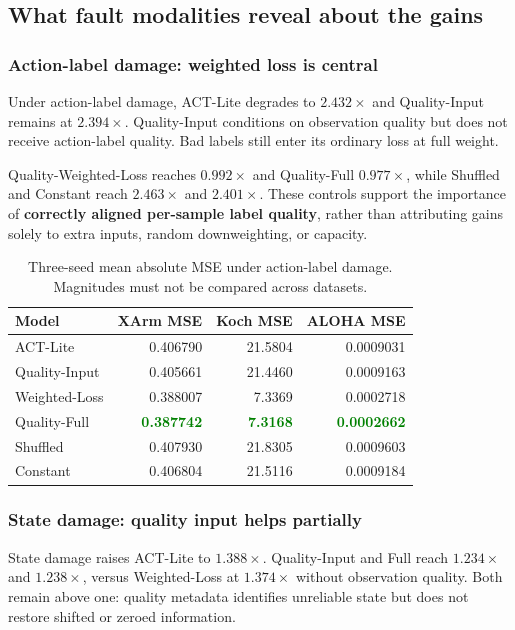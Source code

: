 \documentclass[11pt,a4paper]{article}
\newcommand{\good}[1]{\textcolor{green}{\bfseries #1}}
\begin{document}
\clearpage\subsection{What fault modalities reveal about the gains}
\subsubsection{Action-label damage: weighted loss is central}

Under action-label damage, ACT-Lite degrades to $2.432\times$ and Quality-Input remains at $2.394\times$. Quality-Input conditions on observation quality but does not receive action-label quality. Bad labels still enter its ordinary loss at full weight.

Quality-Weighted-Loss reaches $0.992\times$ and Quality-Full $0.977\times$, while Shuffled and Constant reach $2.463\times$ and $2.401\times$. These controls support the importance of \textbf{correctly aligned per-sample label quality}, rather than attributing gains solely to extra inputs, random downweighting, or capacity.

\begin{table}[htbp]
\centering
\small
\begin{tabularx}{\linewidth}{Y rrr}
\toprule
Model & XArm MSE & Koch MSE & ALOHA MSE\\
\midrule
ACT-Lite & 0.406790 & 21.5804 & 0.0009031\\
Quality-Input & 0.405661 & 21.4460 & 0.0009163\\
Weighted-Loss & 0.388007 & 7.3369 & 0.0002718\\
Quality-Full & \good{0.387742} & \good{7.3168} & \good{0.0002662}\\
Shuffled & 0.407930 & 21.8305 & 0.0009603\\
Constant & 0.406804 & 21.5116 & 0.0009184\\
\bottomrule
\end{tabularx}
\caption{Three-seed mean absolute MSE under action-label damage. Magnitudes must not be compared across datasets.}
\end{table}

\subsubsection{State damage: quality input helps partially}

State damage raises ACT-Lite to $1.388\times$. Quality-Input and Full reach $1.234\times$ and $1.238\times$, versus Weighted-Loss at $1.374\times$ without observation quality. Both remain above one: quality metadata identifies unreliable state but does not restore shifted or zeroed information.
\end{document}
